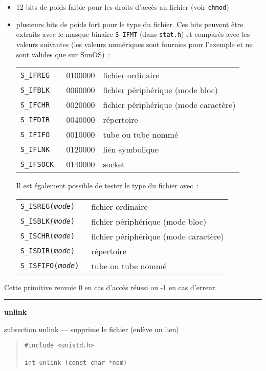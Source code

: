 \documentclass [twoside] {report}
\newcommand {\primitive} [1]
    {
	{\large \bf #1}
	\addcontentsline {toc} {subsection} {#1}
    }
\newcommand {\separation}
    {
	\vspace {7mm}
	\nopagebreak
	\hrule
    }
\begin{document}
\begin {itemize}
    \item 12 bits de poids faible pour les droits d'accès au fichier
	(voir {\tt chmod})
    \item plusieurs bits de poids fort pour le type du fichier. Ces bits
	peuvent être extraits avec le masque binaire {\tt S\_IFMT} (dans
	{\tt stat.h}) et comparés avec les valeurs suivantes (les valeurs
	numériques sont fournies pour l'exemple et ne sont valides que
	sur SunOS)~:

	\begin {tabular} {|lll|} \hline
	    \tt S\_IFREG & 0100000 & fichier ordinaire \\
	    \tt S\_IFBLK & 0060000 & fichier périphérique (mode bloc) \\
	    \tt S\_IFCHR & 0020000 & fichier périphérique (mode caractère) \\
	    \tt S\_IFDIR & 0040000 & répertoire \\
	    \tt S\_IFIFO & 0010000 & tube ou tube nommé \\
	    \tt S\_IFLNK & 0120000 & lien symbolique \\
	    \tt S\_IFSOCK & 0140000 & socket \\
	    \hline
	\end {tabular}

	Il est également possible de tester le type du fichier avec~:

	\begin {tabular} {|ll|} \hline
	    \tt S\_ISREG({\em mode}) & fichier ordinaire \\
	    \tt S\_ISBLK({\em mode}) & fichier périphérique (mode bloc) \\
	    \tt S\_ISCHR({\em mode}) & fichier périphérique (mode caractère) \\
	    \tt S\_ISDIR({\em mode}) & répertoire \\
	    \tt S\_ISFIFO({\em mode}) & tube ou tube nommé \\
	    \hline
	\end {tabular}

\end {itemize}

Cette primitive renvoie 0 en cas d'accès réussi
ou -1 en cas d'erreur.




\separation
\primitive {unlink} --- supprime le fichier (enlève un lien)

\begin {quote}
\begin {verbatim}
#include <unistd.h>

int unlink (const char *nom)
\end{verbatim}
\end {quote}
\end{document}
